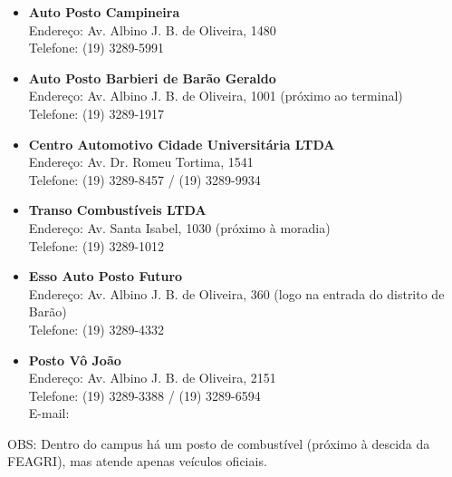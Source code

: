 \begin{itemize}
    \item   \textbf{Auto Posto Campineira}
        \\Endereço: Av. Albino J. B. de Oliveira, 1480
        \\Telefone: (19) 3289-5991

    \item   \textbf{Auto Posto Barbieri de Barão Geraldo}
        \\Endereço: Av. Albino J. B. de Oliveira, 1001 (próximo ao terminal)
        \\Telefone: (19) 3289-1917

    \item   \textbf{Centro Automotivo Cidade Universitária LTDA}
        \\Endereço: Av. Dr. Romeu Tortima, 1541
        \\Telefone: (19) 3289-8457 / (19) 3289-9934

    \item   \textbf{Transo Combustíveis LTDA}
        \\Endereço: Av. Santa Isabel, 1030 (próximo à moradia)
        \\Telefone: (19) 3289-1012

    \item   \textbf{Esso Auto Posto Futuro}
        \\Endereço: Av. Albino J. B. de Oliveira, 360 (logo na entrada do distrito de Barão)
        \\Telefone: (19) 3289-4332

    \item   \textbf{Posto Vô João}
        \\Endereço: Av. Albino J. B. de Oliveira, 2151
        \\Telefone: (19) 3289-3388 / (19) 3289-6594
        \\E-mail: 
\end{itemize}


OBS: Dentro do campus há um posto de combustível (próximo à descida da FEAGRI),
mas atende apenas veículos oficiais.
